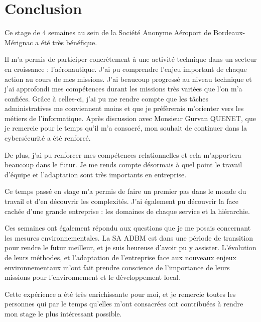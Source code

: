 \chapter{Conclusion}

Ce stage de 4 semaines au sein de la Société Anonyme Aéroport de Bordeaux-Mérignac a été très bénéfique.\newline

Il m'a permis de participer concrètement à une activité technique dans un secteur en croissance : l'aéronautique. J'ai pu comprendre l'enjeu important de chaque action au cours de mes missions. J'ai beaucoup progressé au niveau technique et j'ai approfondi mes compétences durant les missions très variées que l'on m'a confiées. Grâce à celles-ci, j'ai pu me rendre compte que les tâches administratives me conviennent moins et que je préfèrerais m'orienter vers les métiers de l'informatique. Après discussion avec Monsieur Gurvan QUENET, que je remercie pour le temps qu'il m'a consacré, mon souhait de continuer dans la cybersécurité a été renforcé.

De plus, j'ai pu renforcer mes compétences relationnelles et cela m'apportera beaucoup dans le futur. Je me rends compte désormais à quel point le travail d'équipe et l'adaptation sont très importants en entreprise.

Ce temps passé en stage m’a permis de faire un premier pas dans le monde du travail et d’en découvrir les complexités. J’ai également pu découvrir la face cachée d’une grande entreprise : les domaines de chaque service et la hiérarchie.\newline

Ces semaines ont également répondu aux questions que je me posais concernant les mesures environnementales. La SA ADBM est dans une période de transition pour rendre le futur meilleur, et je suis heureuse d'avoir pu y assister. L'évolution de leurs méthodes, et l'adaptation de l'entreprise face aux nouveaux enjeux environnementaux m'ont fait prendre conscience de l'importance de leurs missions pour l'environnement et le développement local.\newline

Cette expérience a été très enrichissante pour moi, et je remercie toutes les personnes qui par le temps qu'elles m'ont consacrées ont contribuées à rendre mon stage le plus intéressant possible.
